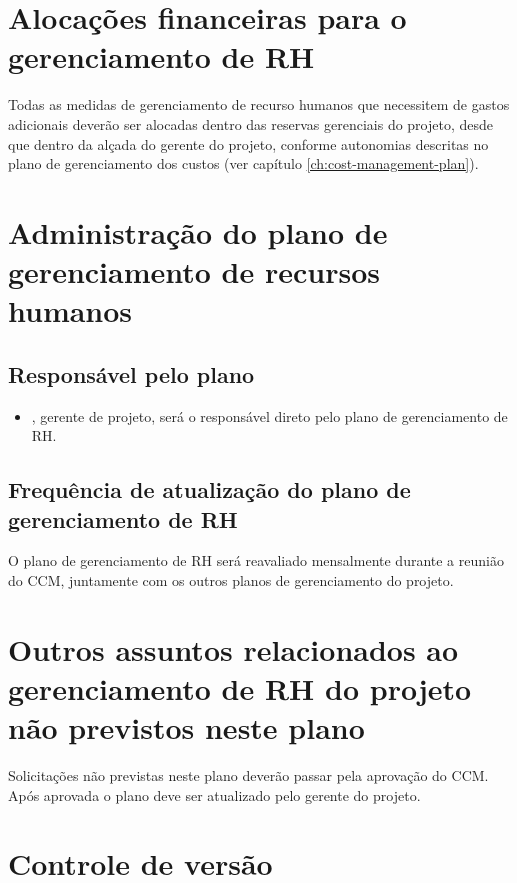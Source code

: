\section{Alocações financeiras para o gerenciamento de RH}

Todas as medidas de gerenciamento de recurso humanos que necessitem de gastos adicionais deverão ser alocadas dentro das reservas gerenciais do projeto, desde que dentro da alçada do gerente do projeto, conforme autonomias descritas no plano de gerenciamento dos custos (ver capítulo \ref{ch:cost-management-plan}). 

\section{Administração do plano de gerenciamento de recursos humanos}

\subsection{Responsável pelo plano}

\begin{itemize}
	\item \projectManagerName{}, gerente de projeto, será o responsável direto pelo plano de gerenciamento de RH.
\end{itemize}

\subsection{Frequência de atualização do plano de gerenciamento de RH}

O plano de gerenciamento de RH será reavaliado mensalmente durante a reunião do CCM, juntamente com os outros planos de gerenciamento do projeto.

\section{Outros assuntos relacionados ao gerenciamento de RH do projeto não previstos neste plano}

Solicitações não previstas neste plano deverão passar pela aprovação do CCM. Após aprovada o plano deve ser atualizado pelo gerente do projeto.

\section{Controle de versão}

